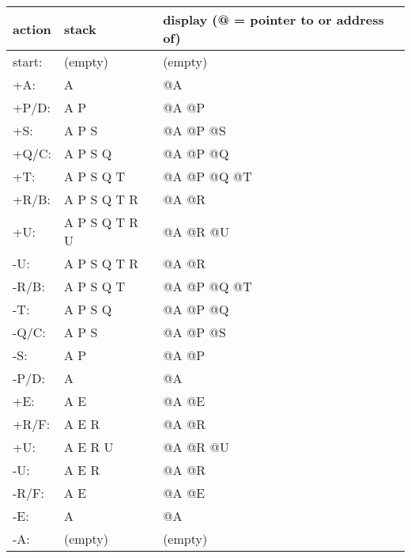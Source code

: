 \documentclass[12pt,letterpaper]{article}
\begin{document}
\begin{enumerate}
\begin{enumerate}
          \begin{tabular}{l l l}
            action & stack & display (@ = pointer to or address of) \\
            \hline
            start: & (empty)        & (empty) \\
            +A:    & A              & @A \\
            +P/D:  & A P            & @A @P \\
            +S:    & A P S          & @A @P @S \\
            +Q/C:  & A P S Q        & @A @P @Q \\
            +T:    & A P S Q T      & @A @P @Q @T\\
            +R/B:  & A P S Q T R    & @A @R \\
            +U:    & A P S Q T R U  & @A @R @U \\
            -U:    & A P S Q T R    & @A @R \\
            -R/B:  & A P S Q T      & @A @P @Q @T \\
            -T:    & A P S Q        & @A @P @Q \\
            -Q/C:  & A P S          & @A @P @S \\
            -S:    & A P            & @A @P \\
            -P/D:  & A              & @A \\
            +E:    & A E            & @A @E \\
            +R/F:  & A E R          & @A @R \\
            +U:    & A E R U        & @A @R @U \\
            -U:    & A E R          & @A @R \\
            -R/F:  & A E            & @A @E \\
            -E:    & A              & @A \\
            -A:    & (empty)        & (empty) \\
          \end{tabular}
      \end{enumerate}
  \end{enumerate}
\end{document}
